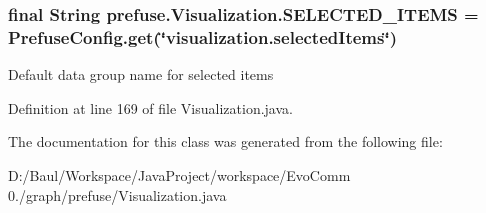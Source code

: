 \hypertarget{classprefuse_1_1_visualization_ad3377de1360bcd1a227089406578b922}{
\subsubsection[{\-S\-E\-L\-E\-C\-T\-E\-D\-\_\-\-I\-T\-E\-M\-S}]{\setlength{\rightskip}{0pt plus 5cm}final \-String {\bf prefuse.\-Visualization.\-S\-E\-L\-E\-C\-T\-E\-D\-\_\-\-I\-T\-E\-M\-S} = \-Prefuse\-Config.\-get(\char`\"{}visualization.\-selected\-Items\char`\"{})}}\label{classprefuse_1_1_visualization_ad3377de1360bcd1a227089406578b922}
\-Default data group name for selected items 

\-Definition at line 169 of file \-Visualization.\-java.



\-The documentation for this class was generated from the following file\-:\begin{DoxyCompactItemize}
\item 
\-D\-:/\-Baul/\-Workspace/\-Java\-Project/workspace/\-Evo\-Comm 0./graph/prefuse/\-Visualization.\-java\end{DoxyCompactItemize}
